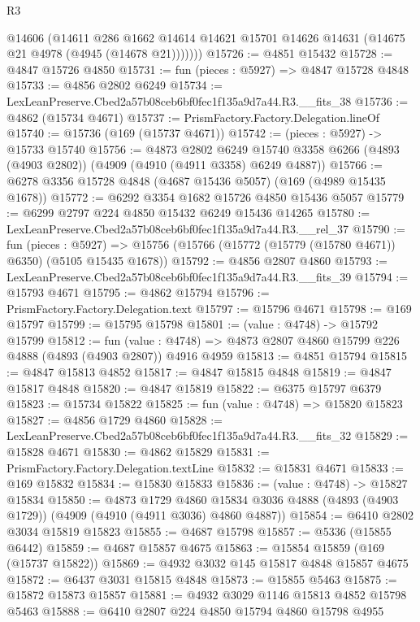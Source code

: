 \begin{lexlean}{R3}
\begin{coremodule}
          @14606
          (@14611
            @286
            @1662
            @14614
            @14621
            @15701
            @14626
            @14631
            (@14675 @21 @4978 (@4945 (@14678 @21)))))))
@15726 := @4851 @15432
@15728 := @4847 @15726 @4850
@15731 := fun (pieces : @5927) => @4847 @15728 @4848
@15733 := @4856 @2802 @6249
@15734 := LexLeanPreserve.Cbed2a57b08ceb6bf0fec1f135a9d7a44.R3.__fits_38
@15736 := @4862 (@15734 @4671)
@15737 := PrismFactory.Factory.Delegation.lineOf
@15740 := @15736 (@169 (@15737 @4671))
@15742 := (pieces : @5927) -> @15733 @15740
@15756 := @4873
    @2802
    @6249
    @15740
    @3358
    @6266
    (@4893 (@4903 @2802))
    (@4909 (@4910 (@4911 @3358) @6249 @4887))
@15766 := @6278 @3356 @15728 @4848 (@4687 @15436 @5057) (@169 (@4989 @15435 @1678))
@15772 := @6292 @3354 @1682 @15726 @4850 @15436 @5057
@15779 := @6299 @2797 @224 @4850 @15432 @6249 @15436 @14265
@15780 := LexLeanPreserve.Cbed2a57b08ceb6bf0fec1f135a9d7a44.R3.__rel_37
@15790 := fun (pieces : @5927) =>
  @15756 (@15766 (@15772 (@15779 (@15780 @4671)) @6350) (@5105 @15435 @1678))
@15792 := @4856 @2807 @4860
@15793 := LexLeanPreserve.Cbed2a57b08ceb6bf0fec1f135a9d7a44.R3.__fits_39
@15794 := @15793 @4671
@15795 := @4862 @15794
@15796 := PrismFactory.Factory.Delegation.text
@15797 := @15796 @4671
@15798 := @169 @15797
@15799 := @15795 @15798
@15801 := (value : @4748) -> @15792 @15799
@15812 := fun (value : @4748) =>
  @4873 @2807 @4860 @15799 @226 @4888 (@4893 (@4903 @2807)) @4916 @4959
@15813 := @4851 @15794
@15815 := @4847 @15813 @4852
@15817 := @4847 @15815 @4848
@15819 := @4847 @15817 @4848
@15820 := @4847 @15819
@15822 := @6375 @15797 @6379
@15823 := @15734 @15822
@15825 := fun (value : @4748) => @15820 @15823
@15827 := @4856 @1729 @4860
@15828 := LexLeanPreserve.Cbed2a57b08ceb6bf0fec1f135a9d7a44.R3.__fits_32
@15829 := @15828 @4671
@15830 := @4862 @15829
@15831 := PrismFactory.Factory.Delegation.textLine
@15832 := @15831 @4671
@15833 := @169 @15832
@15834 := @15830 @15833
@15836 := (value : @4748) -> @15827 @15834
@15850 := @4873
    @1729
    @4860
    @15834
    @3036
    @4888
    (@4893 (@4903 @1729))
    (@4909 (@4910 (@4911 @3036) @4860 @4887))
@15854 := @6410 @2802 @3034 @15819 @15823
@15855 := @4687 @15798
@15857 := @5336 (@15855 @6442)
@15859 := @4687 @15857 @4675
@15863 := @15854 @15859 (@169 (@15737 @15822))
@15869 := @4932 @3032 @145 @15817 @4848 @15857 @4675
@15872 := @6437 @3031 @15815 @4848
@15873 := @15855 @5463
@15875 := @15872 @15873 @15857
@15881 := @4932 @3029 @1146 @15813 @4852 @15798 @5463
@15888 := @6410 @2807 @224 @4850 @15794 @4860 @15798 @4955

\end{coremodule}
\end{lexlean}
